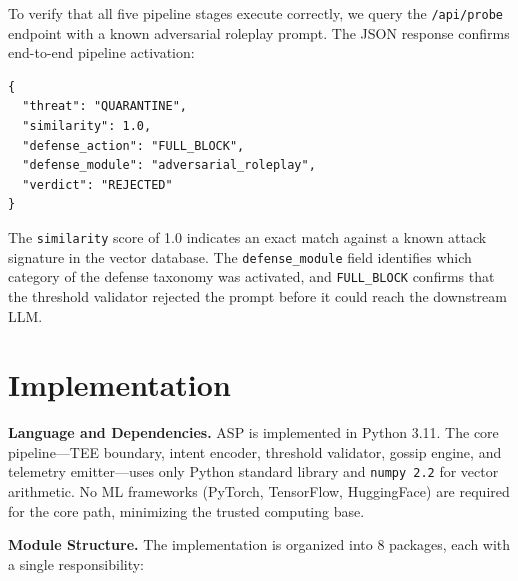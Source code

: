 \documentclass[sigconf,natbib=false]{acmart}
\begin{document}
To verify that all five pipeline stages execute correctly, we query
the \texttt{/api/probe} endpoint with a known adversarial roleplay
prompt. The JSON response confirms end-to-end pipeline activation:

\begin{lstlisting}[language={},caption={Full pipeline response from \texttt{/api/probe}},label={lst:pipeline-response}]
{
  "threat": "QUARANTINE",
  "similarity": 1.0,
  "defense_action": "FULL_BLOCK",
  "defense_module": "adversarial_roleplay",
  "verdict": "REJECTED"
}
\end{lstlisting}

The \texttt{similarity} score of 1.0 indicates an exact match against
a known attack signature in the vector database. The
\texttt{defense\_module} field identifies which category of the defense
taxonomy was activated, and \texttt{FULL\_BLOCK} confirms that the
threshold validator rejected the prompt before it could reach the
downstream LLM.

\section{Implementation}
\label{sec:implementation}

\textbf{Language and Dependencies.}
ASP is implemented in Python 3.11. The core pipeline—TEE boundary,
intent encoder, threshold validator, gossip engine, and telemetry
emitter—uses only Python standard library and \texttt{numpy~2.2}
for vector arithmetic. No ML frameworks (PyTorch, TensorFlow, HuggingFace)
are required for the core path, minimizing the trusted computing base.

\textbf{Module Structure.}
The implementation is organized into 8 packages, each with a single
responsibility:
\end{document}
